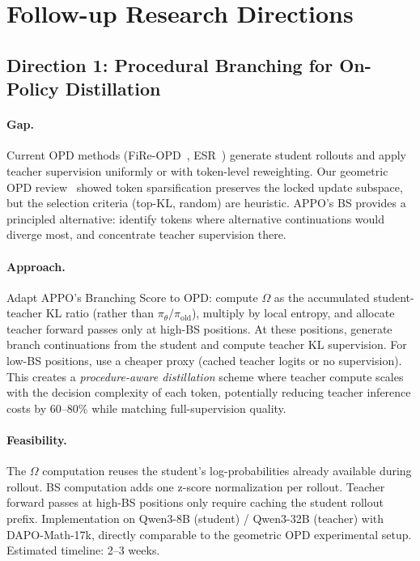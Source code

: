 \documentclass[11pt,a4paper]{article}
\begin{document}
\section{Follow-up Research Directions}

\subsection{Direction 1: Procedural Branching for On-Policy Distillation}

\paragraph{Gap.} Current OPD methods (FiRe-OPD~\cite{li2026fireopd}, ESR~\cite{wang2026esr}) generate student rollouts and apply teacher supervision uniformly or with token-level reweighting. Our geometric OPD review~\cite{shen2026geometry} showed token sparsification preserves the locked update subspace, but the selection criteria (top-KL, random) are heuristic. APPO's BS provides a principled alternative: identify tokens where alternative continuations would diverge most, and concentrate teacher supervision there.

\paragraph{Approach.} Adapt APPO's Branching Score to OPD: compute $\Omega$ as the accumulated student-teacher KL ratio (rather than $\pi_\theta/\pi_{\mathrm{old}}$), multiply by local entropy, and allocate teacher forward passes only at high-BS positions. At these positions, generate branch continuations from the student and compute teacher KL supervision. For low-BS positions, use a cheaper proxy (cached teacher logits or no supervision). This creates a \emph{procedure-aware distillation} scheme where teacher compute scales with the decision complexity of each token, potentially reducing teacher inference costs by 60--80\% while matching full-supervision quality.

\paragraph{Feasibility.} The $\Omega$ computation reuses the student's log-probabilities already available during rollout. BS computation adds one z-score normalization per rollout. Teacher forward passes at high-BS positions only require caching the student rollout prefix. Implementation on Qwen3-8B (student) / Qwen3-32B (teacher) with DAPO-Math-17k, directly comparable to the geometric OPD experimental setup. Estimated timeline: 2--3 weeks.
\end{document}
